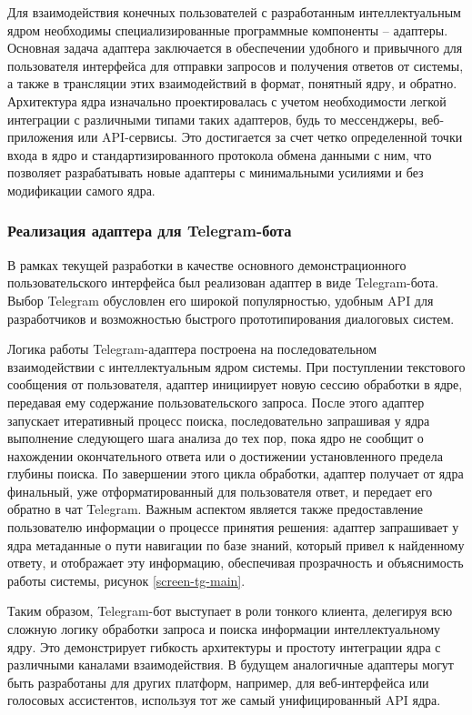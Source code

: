 Для взаимодействия конечных пользователей с разработанным интеллектуальным ядром необходимы специализированные программные компоненты – адаптеры. Основная задача адаптера заключается в обеспечении удобного и привычного для пользователя интерфейса для отправки запросов и получения ответов от системы, а также в трансляции этих взаимодействий в формат, понятный ядру, и обратно. Архитектура ядра изначально проектировалась с учетом необходимости легкой интеграции с различными типами таких адаптеров, будь то мессенджеры, веб-приложения или API-сервисы. Это достигается за счет четко определенной точки входа в ядро и стандартизированного протокола обмена данными с ним, что позволяет разрабатывать новые адаптеры с минимальными усилиями и без модификации самого ядра.

\subsubsection{Реализация адаптера для Telegram-бота}

В рамках текущей разработки в качестве основного демонстрационного пользовательского интерфейса был реализован адаптер в виде Telegram-бота. Выбор Telegram обусловлен его широкой популярностью, удобным API для разработчиков и возможностью быстрого прототипирования диалоговых систем.

Логика работы Telegram-адаптера построена на последовательном взаимодействии с интеллектуальным ядром системы. При поступлении текстового сообщения от пользователя, адаптер инициирует новую сессию обработки в ядре, передавая ему содержание пользовательского запроса. После этого адаптер запускает итеративный процесс поиска, последовательно запрашивая у ядра выполнение следующего шага анализа до тех пор, пока ядро не сообщит о нахождении окончательного ответа или о достижении установленного предела глубины поиска. По завершении этого цикла обработки, адаптер получает от ядра финальный, уже отформатированный для пользователя ответ, и передает его обратно в чат Telegram. Важным аспектом является также предоставление пользователю информации о процессе принятия решения: адаптер запрашивает у ядра метаданные о пути навигации по базе знаний, который привел к найденному ответу, и отображает эту информацию, обеспечивая прозрачность и объяснимость работы системы, рисунок \ref{screen-tg-main}.


Таким образом, Telegram-бот выступает в роли тонкого клиента, делегируя всю сложную логику обработки запроса и поиска информации интеллектуальному ядру. Это демонстрирует гибкость архитектуры и простоту интеграции ядра с различными каналами взаимодействия. В будущем аналогичные адаптеры могут быть разработаны для других платформ, например, для веб-интерфейса или голосовых ассистентов, используя тот же самый унифицированный API ядра.


